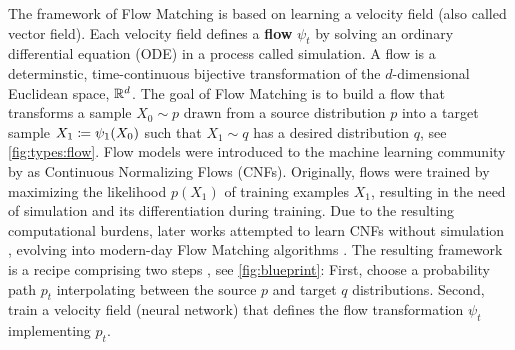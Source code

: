 \documentclass{fairmeta}
\newcommand{\highlight}[1]{{\color{metablue} \textbf{#1}}}
\numberwithin{equation}{section}
\begin{document}
The framework of Flow Matching is based on learning a velocity field (also called vector field). Each velocity field defines a \highlight{flow} $\psi_t$ by solving an ordinary differential equation (ODE) in a process called simulation. A flow is a determinstic, time-continuous bijective transformation of the $d$-dimensional Euclidean space, $\mathbb R^d$. The goal of Flow Matching is to build a flow that transforms a sample $X_0 \sim p$ drawn from a source distribution $p$ into a target sample $X_1\coloneqq \psi_1(X_0)$ such that $X_1\sim q$ has a desired distribution $q$, see \cref{fig:types:flow}. Flow models were introduced to the machine learning community by \citep{chen2018neural,grathwohl2018ffjord} as Continuous Normalizing Flows (CNFs). Originally, flows were trained by maximizing the likelihood $p(X_1)$ of training examples $X_1$, resulting in the need of simulation and its differentiation during training.
Due to the resulting computational burdens, later works attempted to learn CNFs without simulation \citep{rozen2021moser,benhamu2022cnfm}, evolving into modern-day Flow Matching algorithms \citep{lipman2022flow,liu2022flow,albergo2022building,neklyudov2023action,heitz2023iterative,tong2023improving}.
The resulting framework is a recipe comprising two steps \citep{lipman2022flow}, see \cref{fig:blueprint}: 
First, choose a probability path $p_t$ interpolating between the source $p$ and target $q$ distributions.
Second, train a velocity field (neural network) that defines the flow transformation $\psi_t$ implementing $p_t$.
\end{document}
